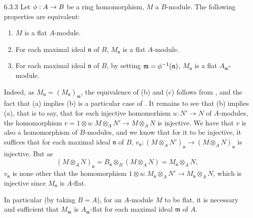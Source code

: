 \begin{env}{6.3.3}
\label{env-0.6.3.3}
Let $\phi:A\to B$ be a ring homomorphism, $M$ a $B$-module. The following properties are
equivalent:
\begin{enumerate}[label=(\alph*)]
  \item $M$ is a flat $A$-module.
  \item For each maximal ideal $\mathfrak{n}$ of $B$, $M_\mathfrak{n}$ is a flat $A$-module.
  \item For each maximal ideal $\mathfrak{n}$ of $B$, by setting
        $\mathfrak{m}=\phi^{-1}(\mathfrak{n})$, $M_\mathfrak{n}$ is a flat
        $A_\mathfrak{m}$-module.
\end{enumerate}

Indeed, as $M_\mathfrak{n}=(M_\mathfrak{n})_\mathfrak{m}$, the equivalence of (b) and (c)
follows from , and the fact that (a) implies (b) is a particular case of
. It remains to see that (b) implies (a),
that is to say, that for each injective homomorhism $u:N'\to N$ of $A$-modules, the
homomorphism $v=1\otimes u:M\otimes_A N'\to M\otimes_A N$ is injective. We have that $v$ is
also a homomorphism of $B$-modules, and we know that for it to be injective, it suffices that
for each maximal ideal $\mathfrak{n}$ of $B$,
$v_\mathfrak{n}:(M\otimes_A N')_\mathfrak{n}\to(M\otimes_A N)_\mathfrak{n}$ is injective. But
as
\[
  (M\otimes_A N)_\mathfrak{n}=B_\mathfrak{n}\otimes_B(M\otimes_A N)
  =M_\mathfrak{n}\otimes_A N,
\]
$v_\mathfrak{n}$ is none other that the homomorphism
$1\otimes u:M_\mathfrak{n}\otimes_A N'\to M_\mathfrak{n}\otimes_A N$, which is injective
since $M_\mathfrak{n}$ is $A$-flat.

In particular (by taking $B=A$), for an $A$-module $M$ to be flat, it is necessary and
sufficient that $M_\mathfrak{m}$ is $A_\mathfrak{m}$-flat for each maximal ideal
$\mathfrak{m}$ of $A$.
\end{env}

